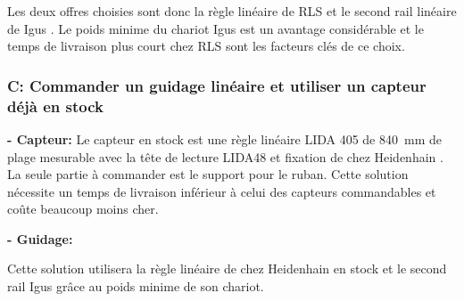 Les deux offres choisies sont donc la règle linéaire de RLS \cite{RLS} et le second rail linéaire de Igus \cite{Igus}. Le poids minime du chariot Igus \cite{Igus} est un avantage considérable
et le temps de livraison plus court chez RLS \cite{RLS} sont les facteurs clés de ce choix.

\subsubsection{C: Commander un guidage linéaire et utiliser un capteur déjà en stock}
\textbf{ - Capteur:}
\newline
Le capteur en stock est une règle linéaire LIDA 405 de 840~mm de plage mesurable avec la tête de lecture LIDA48 et fixation de chez Heidenhain \cite{Heidenhain}. La seule partie à commander
est le support pour le ruban. Cette solution nécessite un temps de livraison inférieur à celui des capteurs commandables et coûte beaucoup moins cher.

\textbf{ - Guidage:}
\newline

\begin{table}[H]
    \centering
    \caption{Offres pour le guidage}
    \label{tab:OffreGuid2}
\end{table}

Cette solution utilisera la règle linéaire de chez Heidenhain \cite{Heidenhain} en stock et le second rail Igus \cite{Igus} grâce au poids minime de son chariot.

